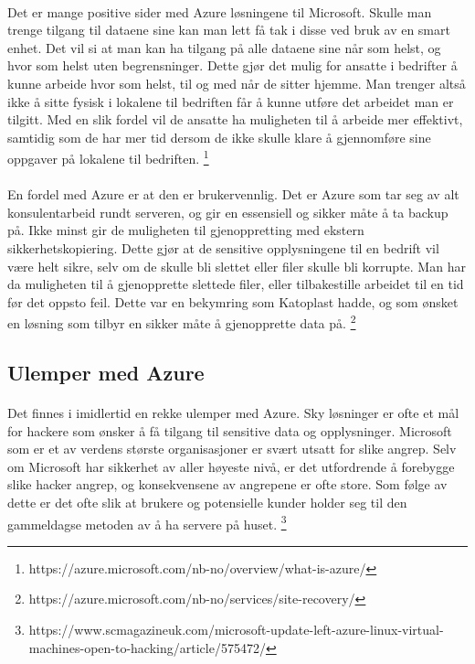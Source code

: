 \paragraph{}Det er mange positive sider med Azure løsningene til Microsoft. Skulle man trenge tilgang til dataene sine kan man lett få tak i disse ved bruk av en smart enhet. Det vil si at man kan ha tilgang på alle dataene sine når som helst, og hvor som helst uten begrensninger. Dette gjør det mulig for ansatte i bedrifter å kunne arbeide hvor som helst, til og med når de sitter hjemme. Man trenger altså ikke å sitte fysisk i lokalene til bedriften får å kunne utføre det arbeidet man er tilgitt. Med en slik fordel vil de ansatte ha muligheten til å arbeide mer effektivt, samtidig som de har mer tid dersom de ikke skulle klare å gjennomføre sine oppgaver på lokalene til bedriften. 
\footnote{https://azure.microsoft.com/nb-no/overview/what-is-azure/}

\paragraph{} En fordel med Azure er at den er brukervennlig. Det er Azure som tar seg av alt konsulentarbeid rundt serveren, og gir en essensiell og sikker måte å ta backup på. Ikke minst gir de muligheten til gjenoppretting med ekstern sikkerhetskopiering. Dette gjør at de sensitive opplysningene til en bedrift vil være helt sikre, selv om de skulle bli slettet eller filer skulle bli korrupte. Man har da muligheten til å gjenopprette slettede filer, eller tilbakestille arbeidet til en tid før det oppsto feil. Dette var en bekymring som Katoplast hadde, og som ønsket en løsning som tilbyr en sikker måte å gjenopprette data på.
\footnote{https://azure.microsoft.com/nb-no/services/site-recovery/}

\subsection{Ulemper med Azure}
\paragraph{} Det finnes i imidlertid en rekke ulemper med Azure. Sky løsninger er ofte et mål for hackere som ønsker å få tilgang til sensitive data og opplysninger. Microsoft som er et av verdens største organisasjoner er svært utsatt for slike angrep. Selv om Microsoft har sikkerhet av aller høyeste nivå, er det utfordrende å forebygge slike hacker angrep, og konsekvensene av angrepene er ofte store. Som følge av dette er det ofte slik at brukere og potensielle kunder holder seg til den gammeldagse metoden av å ha servere på huset. 
\footnote{https://www.scmagazineuk.com/microsoft-update-left-azure-linux-virtual-machines-open-to-hacking/article/575472/}


